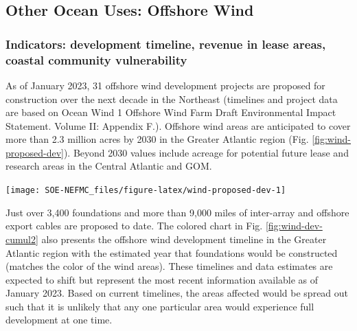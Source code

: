 \documentclass[
  10pt,
]{article}
\let\origfigure\figure
\let\endorigfigure\endfigure
\renewenvironment{figure}[1][2] {
    \expandafter\origfigure\expandafter[H]
} {
    \endorigfigure
}
\begin{document}
\hypertarget{other-ocean-uses-offshore-wind}{%
\subsection{Other Ocean Uses: Offshore Wind}\label{other-ocean-uses-offshore-wind}}

\hypertarget{indicators-development-timeline-revenue-in-lease-areas-coastal-community-vulnerability}{%
\subsubsection{Indicators: development timeline, revenue in lease areas, coastal community vulnerability}\label{indicators-development-timeline-revenue-in-lease-areas-coastal-community-vulnerability}}

As of January 2023, 31 offshore wind development projects are proposed for construction over the next decade in the Northeast (timelines and project data are based on Ocean Wind 1 Offshore Wind Farm Draft Environmental Impact Statement. Volume II: Appendix F.). Offshore wind areas are anticipated to cover more than 2.3 million acres by 2030 in the Greater Atlantic region (Fig. \ref{fig:wind-proposed-dev}). Beyond 2030 values include acreage for potential future lease and research areas in the Central Atlantic and GOM.

\begin{figure}

{\centering \texttt{[image: SOE-NEFMC\_files/figure-latex/wind-proposed-dev-1]} 

}

\caption{Proposed wind development on the northeast shelf.}\label{fig:wind-proposed-dev}
\end{figure}

Just over 3,400 foundations and more than 9,000 miles of inter-array and offshore export cables are proposed to date. The colored chart in Fig. \ref{fig:wind-dev-cumul2} also presents the offshore wind development timeline in the Greater Atlantic region with the estimated year that foundations would be constructed (matches the color of the wind areas). These timelines and data estimates are expected to shift but represent the most recent information available as of January 2023. Based on current timelines, the areas affected would be spread out such that it is unlikely that any one particular area would experience full development at one time.
\end{document}
